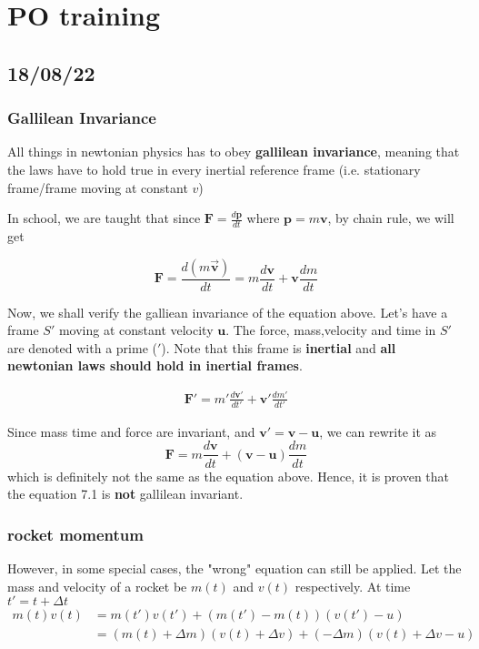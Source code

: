\chapter{PO training}

\section{18/08/22}
\subsection{Gallilean Invariance}
All things in newtonian physics has to obey \textbf{gallilean invariance}, meaning that the laws have to hold true in every inertial reference frame (i.e. stationary frame/frame moving at constant $v$)

In school, we are taught that since $\mathbf{F}=\frac{d\mathbf{p}}{dt}$ where $\mathbf{p}=m \mathbf{v}$, by chain rule, we will get 

\begin{equation}
    \mathbf{F}=\frac{d (m\mathbf{\vec{v}})}{dt}=m\frac{d\mathbf{v}}{dt}+\mathbf{v} \frac{dm}{dt}
\end{equation}

Now, we shall verify the galliean invariance of the equation above. Let's have a frame $S'$ moving at constant velocity $\mathbf{u}$. The force, mass,velocity and time in $S'$ are denoted with a prime ($'$). Note that this frame is \textbf{inertial} and \textbf{all newtonian laws should hold in inertial frames}.

\begin{align}
    \mathbf{F}'=m'\frac{d\mathbf{v'}}{dt'}+\mathbf{v'} \frac{dm'}{dt'}
\end{align}

Since mass time and force are invariant, and $\mathbf{v'}=\mathbf{v}-\mathbf{u}$, we can rewrite it as 
\begin{equation}
    \mathbf{F}=m\frac{d\mathbf{v}}{dt}+(\mathbf{v}-\mathbf{u})\frac{dm}{dt}
\end{equation}
which is definitely not the same as the equation above. Hence, it is proven that the equation 7.1 is \textbf{not} gallilean invariant.

\subsection{rocket momentum}
However, in some special cases, the "wrong" equation can still be applied. 
Let the mass and velocity of a rocket be $m(t)$ and $v(t)$ respectively. 
At time $t'=t+\Delta t$
\begin{align}
    m(t)v(t) 
    &= m(t')v(t')+ (m(t')-m(t))(v(t')-u)\\
    &= (m(t)+\Delta m)(v(t)+\Delta v)+(-\Delta m)(v(t)+\Delta v - u)
\end{align}

